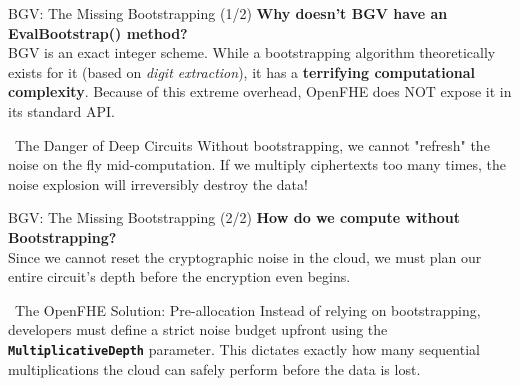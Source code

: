 \documentclass[aspectratio=169, 10pt]{beamer}
\begin{document}
\begin{frame}{BGV: The Missing Bootstrapping (1/2)}
\Large \textbf{Why doesn't BGV have an EvalBootstrap() method?} \\
\vspace{0.4cm}
\normalsize
BGV is an exact integer scheme. While a bootstrapping algorithm theoretically exists for it (based on \textit{digit extraction}), it has a \textbf{terrifying computational complexity}. Because of this extreme overhead, OpenFHE does NOT expose it in its standard API.

\vspace{0.5cm}
\begin{alertblock}{\faExclamationTriangle \ The Danger of Deep Circuits}
    Without bootstrapping, we cannot "refresh" the noise on the fly mid-computation. If we multiply ciphertexts too many times, the noise explosion will irreversibly destroy the data!
\end{alertblock}
\end{frame}

\begin{frame}{BGV: The Missing Bootstrapping (2/2)}
\Large \textbf{How do we compute without Bootstrapping?} \\
\vspace{0.4cm}
\normalsize
Since we cannot reset the cryptographic noise in the cloud, we must plan our entire circuit's depth before the encryption even begins.

\vspace{0.5cm}
\begin{exampleblock}{\faCheckCircle \ The OpenFHE Solution: Pre-allocation}
    Instead of relying on bootstrapping, developers must define a strict noise budget upfront using the \textbf{\texttt{MultiplicativeDepth}} parameter. This dictates exactly how many sequential multiplications the cloud can safely perform before the data is lost.
\end{exampleblock}
\end{frame}
\end{document}
